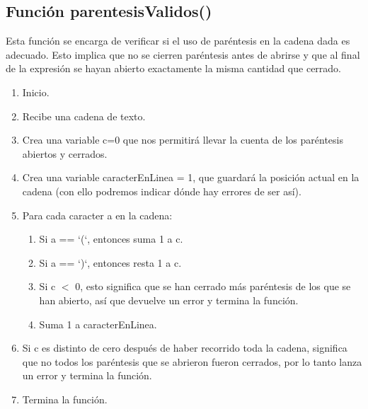 \documentclass{article}
\begin{document}
\subsection{Función parentesisValidos()}
\normalsize Esta función se encarga de verificar si el uso de paréntesis en la cadena dada es adecuado. Esto implica que no se cierren paréntesis antes de abrirse y que al final de la expresión se hayan abierto exactamente la misma cantidad que cerrado.
\begin{enumerate}
    \item Inicio.
    \item Recibe una cadena de texto.
    \item Crea una variable c=0 que nos permitirá llevar la cuenta de los paréntesis abiertos y cerrados.
    \item Crea una variable caracterEnLinea = 1, que guardará la posición actual en la cadena (con ello podremos indicar dónde hay errores de ser así).
    \item Para cada caracter a  en la cadena:
    \begin{enumerate}
        \item Si a  == ‘(‘, entonces suma 1 a c.
        \item Si a  == ‘)‘, entonces resta 1 a c.
        \item Si c $<$ 0, esto significa que se han cerrado más paréntesis de los que se han abierto, así que devuelve un error y termina la función.
        \item Suma 1 a caracterEnLinea.
    \end{enumerate}
    \item Si c es distinto de cero después de haber recorrido toda la cadena, significa que no todos los paréntesis que se abrieron fueron cerrados, por lo tanto lanza un error y termina la función.
    \item Termina la función.
\end{enumerate}
\end{document}
